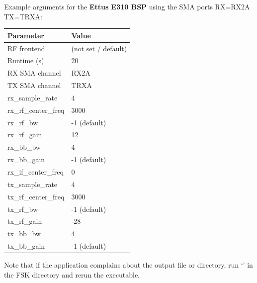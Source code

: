 \noindent Example arguments for the \textbf{Ettus E310 BSP} using the SMA ports RX=RX2A TX=TRXA:\\
\begin{tabular}{|l|l|}
\hline
\rowcolor{blue}
Parameter 	&        Value  	\\
\hline
RF frontend 	&        (not set / default)  	\\
\hline
Runtime (s) 	&        20 	        \\
\hline
RX SMA channel 	&        RX2A              	\\
\hline
TX SMA channel 	&        TRXA           	\\
\hline
rx\_sample\_rate 	&4 	                \\
\hline
rx\_rf\_center\_freq 	&3000  	\\
\hline
rx\_rf\_bw 	&        -1 (default)   \\
\hline
rx\_rf\_gain 	&        12       	\\
\hline
rx\_bb\_bw 	&        4 	        \\
\hline
rx\_bb\_gain 	&        -1 (default) 	\\
\hline
rx\_if\_center\_freq 	&0              	\\
\hline
tx\_sample\_rate 	&4              	\\
\hline
tx\_rf\_center\_freq 	&3000 	        \\
\hline
tx\_rf\_bw 	&        -1 (default)   \\
\hline
tx\_rf\_gain 	&        -28 	        \\
\hline
tx\_bb\_bw 	&        4        	\\
\hline
tx\_bb\_gain    &       -1 (default) \\
\hline
\end{tabular}\par\medskip

\noindent Note that if the application complains about the output file or directory, run `' in the FSK directory and rerun the executable.
\pagebreak
